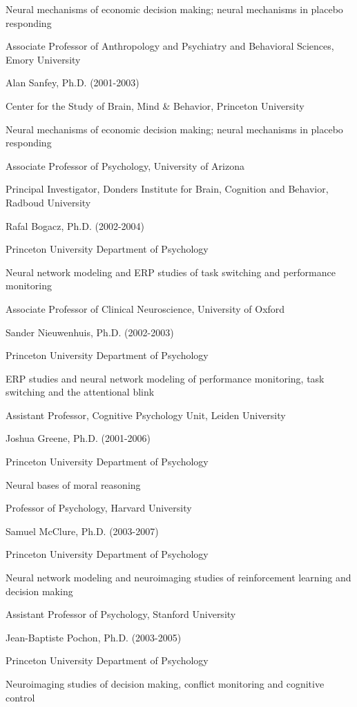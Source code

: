 \documentclass[10 pt]{article}
\begin{document}
Neural mechanisms of economic decision making; neural mechanisms in placebo responding

Associate Professor of Anthropology and Psychiatry and Behavioral Sciences, Emory University
    \medskip

Alan Sanfey, Ph.D. (2001-2003)

Center for the Study of Brain, Mind \& Behavior, Princeton University

Neural mechanisms of economic decision making; neural mechanisms in placebo responding

Associate Professor of Psychology, University of Arizona

Principal Investigator, Donders Institute for Brain, Cognition and Behavior, Radboud University
    \medskip

Rafal Bogacz, Ph.D. (2002-2004)

Princeton University Department of Psychology

Neural network modeling and ERP studies of task switching and performance monitoring

Associate Professor of Clinical Neuroscience, University of Oxford
    \medskip

Sander Nieuwenhuis, Ph.D. (2002-2003)

Princeton University Department of Psychology

ERP studies and neural network modeling of performance monitoring, task switching and the attentional blink

Assistant Professor, Cognitive Psychology Unit, Leiden University
    \medskip

Joshua Greene, Ph.D. (2001-2006)

Princeton University Department of Psychology

Neural bases of moral reasoning

Professor of Psychology, Harvard University
    \medskip

Samuel McClure, Ph.D. (2003-2007)

Princeton University Department of Psychology

Neural network modeling and neuroimaging studies of reinforcement learning and decision making

Assistant Professor of Psychology, Stanford University
    \medskip

Jean-Baptiste Pochon, Ph.D. (2003-2005)

Princeton University Department of Psychology

Neuroimaging studies of decision making, conflict monitoring and cognitive control
\end{document}
